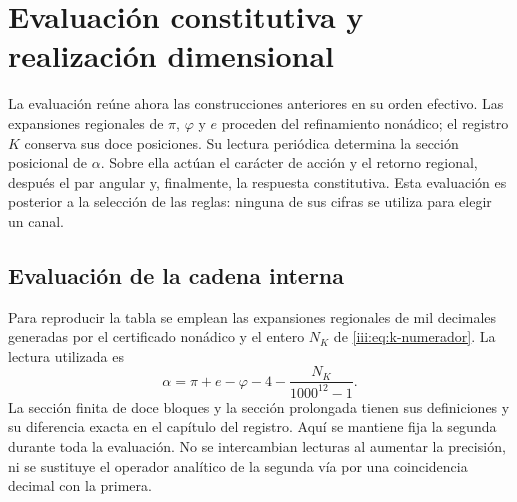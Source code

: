 \section{Evaluación constitutiva y realización dimensional}
\label{iii:iii:sec:evaluacion}

La evaluación reúne ahora las construcciones anteriores en su orden efectivo.
Las expansiones regionales de $\pi$, $\varphi$ y $e$ proceden del refinamiento
nonádico; el registro $K$ conserva sus doce posiciones. Su lectura periódica
determina la sección posicional de $\alpha$. Sobre ella actúan el carácter
de acción y el retorno regional, después el par angular y, finalmente, la
respuesta constitutiva. Esta evaluación es posterior a la selección de las
reglas: ninguna de sus cifras se utiliza para elegir un canal.

\subsection{Evaluación de la cadena interna}

Para reproducir la tabla se emplean las expansiones regionales de mil
decimales generadas por el certificado nonádico y el entero $N_K$ de
\eqref{iii:eq:k-numerador}. La lectura utilizada es
\[
 \alpha=\pi+e-\varphi-4-\frac{N_K}{1000^{12}-1}.
\]
La sección finita de doce bloques y la sección prolongada tienen sus
definiciones y su diferencia exacta en el capítulo del registro. Aquí se
mantiene fija la segunda durante toda la evaluación. No se intercambian
lecturas al aumentar la precisión, ni se sustituye el operador analítico
de la segunda vía por una coincidencia decimal con la primera.


